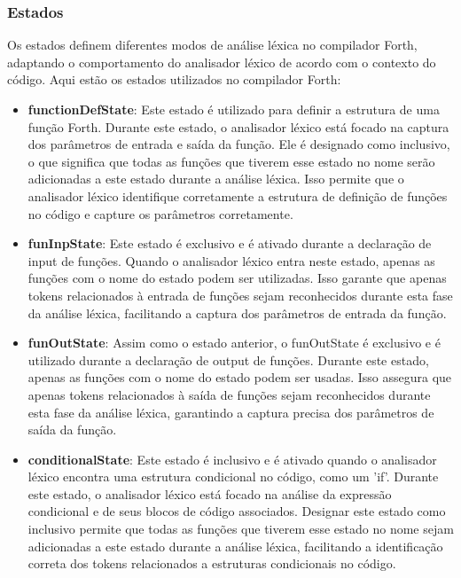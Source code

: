 \documentclass{predef}
\begin{document}
\subsubsection{Estados}

Os estados definem diferentes modos de análise léxica no compilador Forth, adaptando o comportamento do analisador léxico de acordo com o contexto do código. Aqui estão os estados utilizados no compilador Forth:

\begin{itemize}
    \item \textbf{functionDefState}: Este estado é utilizado para definir a estrutura de uma função Forth. Durante este estado, o analisador léxico está focado na captura dos parâmetros de entrada e saída da função. Ele é designado como inclusivo, o que significa que todas as funções que tiverem esse estado no nome serão adicionadas a este estado durante a análise léxica. Isso permite que o analisador léxico identifique corretamente a estrutura de definição de funções no código e capture os parâmetros corretamente.
    
    \item \textbf{funInpState}: Este estado é exclusivo e é ativado durante a declaração de input de funções. Quando o analisador léxico entra neste estado, apenas as funções com o nome do estado podem ser utilizadas. Isso garante que apenas tokens relacionados à entrada de funções sejam reconhecidos durante esta fase da análise léxica, facilitando a captura dos parâmetros de entrada da função.
    
    \item \textbf{funOutState}: Assim como o estado anterior, o funOutState é exclusivo e é utilizado durante a declaração de output de funções. Durante este estado, apenas as funções com o nome do estado podem ser usadas. Isso assegura que apenas tokens relacionados à saída de funções sejam reconhecidos durante esta fase da análise léxica, garantindo a captura precisa dos parâmetros de saída da função.
    
    \item \textbf{conditionalState}: Este estado é inclusivo e é ativado quando o analisador léxico encontra uma estrutura condicional no código, como um 'if'. Durante este estado, o analisador léxico está focado na análise da expressão condicional e de seus blocos de código associados. Designar este estado como inclusivo permite que todas as funções que tiverem esse estado no nome sejam adicionadas a este estado durante a análise léxica, facilitando a identificação correta dos tokens relacionados a estruturas condicionais no código.
\end{itemize}
\end{document}
